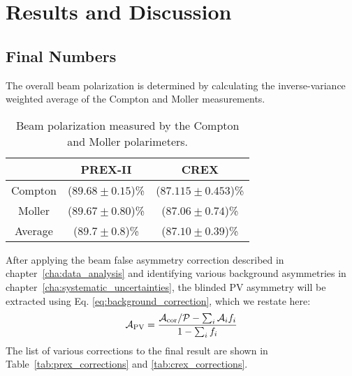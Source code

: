 \chapter{Results and Discussion}

\section{Final Numbers}

\begin{comment}
    Measured asymmetry 
    $\downarrow$
    correct for Coulomb distortions 
    $\downarrow$
    Weak density at one $Q^2$
    $\downarrow$
    small correction for $G_E^n$, $G_E^s$
    $\downarrow$
    Neutron density at one $Q^2$
    $\downarrow$
    assume surface thickness good to 25\% (MFT)
    $\downarrow$
    $R_n$

\end{comment}
The overall beam polarization is determined by calculating the inverse-variance 
weighted average of the Compton and Moller measurements.
\begin{table}[!h]
    \centering
    \begin{tabular}{c | c c}
	\hline
	    & PREX-II	& CREX	\\
	\hline
	Compton	& ($89.68 \pm 0.15$)\%  & ($87.115 \pm 0.453$)\%	\\
	Moller	& ($89.67 \pm 0.80$)\%	& ($87.06 \pm 0.74$)\%  \\
	\hline
	Average	& ($89.7 \pm 0.8$)\%	& ($87.10 \pm 0.39$)\%	\\
	\hline
    \end{tabular}
    \caption{Beam polarization measured by the Compton and Moller polarimeters.}
\end{table}

After applying the beam false asymmetry correction described in chapter~\ref{cha:data_analysis} and
identifying various background asymmetries in chapter~\ref{cha:systematic_uncertainties}, 
the blinded PV asymmetry will be extracted using Eq. \ref{eq:background_correction}, 
which we restate here:
\begin{equation*}
    \mathcal{A}_{\text{PV}} = \frac{\mathcal{A}_{\text{cor}}/\mathcal{P} - \sum_i \mathcal{A}_i f_i}{1 - \sum_i f_i}
\end{equation*}
The list of various corrections to the final result are shown in 
Table~\ref{tab:prex_corrections} and \ref{tab:crex_corrections}.

